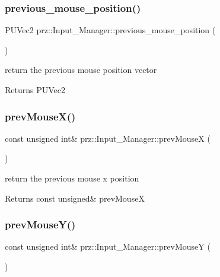 \subsubsection{\texorpdfstring{previous\_mouse\_position()}{previous\_mouse\_position()}}
{\footnotesize\ttfamily P\+U\+Vec2 prz\+::\+Input\+\_\+\+Manager\+::previous\+\_\+mouse\+\_\+position (\begin{DoxyParamCaption}{ }\end{DoxyParamCaption})\hspace{0.3cm}{\ttfamily [inline]}}



return the previous mouse position vector 

\begin{DoxyReturn}{Returns}
P\+U\+Vec2 
\end{DoxyReturn}
\mbox{\label{classprz_1_1_input___manager_ab71276ab97b9270a69b7ea21856cb92a}} 
\subsubsection{\texorpdfstring{prevMouseX()}{prevMouseX()}}
{\footnotesize\ttfamily const unsigned int\& prz\+::\+Input\+\_\+\+Manager\+::prev\+MouseX (\begin{DoxyParamCaption}{ }\end{DoxyParamCaption})\hspace{0.3cm}{\ttfamily [inline]}}



return the previous mouse x position 

\begin{DoxyReturn}{Returns}
const unsigned\& prev\+MouseX 
\end{DoxyReturn}
\mbox{\label{classprz_1_1_input___manager_a29a282fe4727180e4ea68a67417efea0}} 
\subsubsection{\texorpdfstring{prevMouseY()}{prevMouseY()}}
{\footnotesize\ttfamily const unsigned int\& prz\+::\+Input\+\_\+\+Manager\+::prev\+MouseY (\begin{DoxyParamCaption}{ }\end{DoxyParamCaption})\hspace{0.3cm}{\ttfamily [inline]}}



